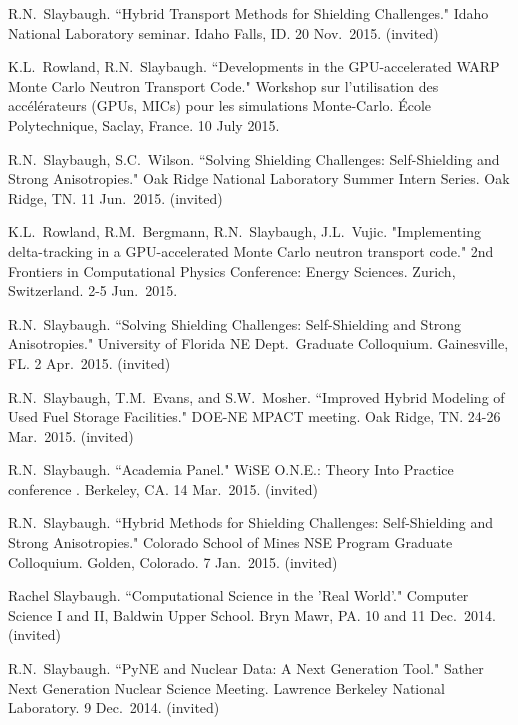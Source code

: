 \begin{bibsection}
\item R.N.\ Slaybaugh. ``Hybrid Transport Methods for Shielding Challenges." Idaho National Laboratory seminar. Idaho Falls, ID. 20 Nov.\ 2015. (invited) 

\item K.L.\ Rowland, R.N.\ Slaybaugh. ``Developments in the GPU-accelerated WARP Monte Carlo Neutron Transport Code." Workshop sur l'utilisation des acc\'{e}l\'{e}rateurs (GPUs, MICs) pour les simulations Monte-Carlo. \'{E}cole Polytechnique, Saclay, France. 10 July 2015. 

\item R.N.\ Slaybaugh, S.C.\ Wilson. ``Solving Shielding Challenges: Self-Shielding and Strong Anisotropies." Oak Ridge National Laboratory Summer Intern Series. Oak Ridge, TN. 11 Jun.\ 2015. (invited)

\item K.L.\ Rowland, R.M.\ Bergmann, R.N.\ Slaybaugh, J.L.\ Vujic. "Implementing delta-tracking in a GPU-accelerated Monte Carlo neutron transport code." 2nd Frontiers in Computational Physics Conference: Energy Sciences. Zurich, Switzerland. 2-5 Jun.\ 2015.  

\item R.N.\ Slaybaugh. ``Solving Shielding Challenges: Self-Shielding and Strong Anisotropies." University of Florida NE Dept.\ Graduate Colloquium. Gainesville, FL. 2 Apr.\ 2015. (invited)

\item R.N.\ Slaybaugh, T.M.\ Evans, and S.W.\ Mosher. ``Improved Hybrid Modeling of Used Fuel Storage Facilities." DOE-NE MPACT meeting. Oak Ridge, TN. 24-26 Mar.\ 2015. (invited)

\item R.N.\ Slaybaugh. ``Academia Panel." WiSE O.N.E.: Theory Into Practice conference . Berkeley, CA. 14 Mar.\ 2015. (invited)

\item R.N.\ Slaybaugh. ``Hybrid Methods for Shielding Challenges: Self-Shielding and Strong Anisotropies." Colorado School of Mines NSE Program Graduate Colloquium. Golden, Colorado. 7 Jan.\ 2015. (invited)

\item Rachel Slaybaugh. ``Computational Science in the 'Real World'." Computer Science I and II, Baldwin Upper School. Bryn Mawr, PA. 10 and 11 Dec.\ 2014. (invited)

\item R.N.\ Slaybaugh. ``PyNE and Nuclear Data: A Next Generation Tool." Sather Next Generation Nuclear Science Meeting. Lawrence Berkeley National Laboratory. 9 Dec.\ 2014. (invited)


\end{bibsection}
